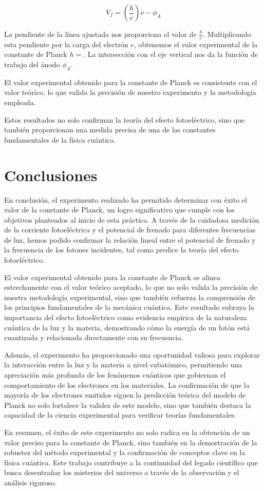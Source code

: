 \documentclass[twocolumn,a4paper,11pt]{scrartcl}
\begin{document}
\begin{equation}
V_f = \left(\frac{h}{e}\right) \nu - \phi_A
\end{equation}

La pendiente de la línea ajustada nos proporciona el valor de $\frac{h}{e}$. Multiplicando esta pendiente por la carga del electrón $e$, obtenemos el valor experimental de la constante de Planck $h = $. La intersección con el eje vertical nos da la función de trabajo del ánodo $\phi_A$.

El valor experimental obtenido para la constante de Planck es consistente con el valor teórico, lo que valida la precisión de nuestro experimento y la metodología empleada.

Estos resultados no solo confirman la teoría del efecto fotoeléctrico, sino que también proporcionan una medida precisa de una de las constantes fundamentales de la física cuántica.


\section{Conclusiones}

En conclusión, el experimento realizado ha permitido determinar con éxito el valor de la constante de Planck, un logro significativo que cumple con los objetivos planteados al inicio de esta práctica. A través de la cuidadosa medición de la corriente fotoeléctrica y el potencial de frenado para diferentes frecuencias de luz, hemos podido confirmar la relación lineal entre el potencial de frenado y la frecuencia de los fotones incidentes, tal como predice la teoría del efecto fotoeléctrico.

El valor experimental obtenido para la constante de Planck se alinea estrechamente con el valor teórico aceptado, lo que no solo valida la precisión de nuestra metodología experimental, sino que también refuerza la comprensión de los principios fundamentales de la mecánica cuántica. Este resultado subraya la importancia del efecto fotoeléctrico como evidencia empírica de la naturaleza cuántica de la luz y la materia, demostrando cómo la energía de un fotón está cuantizada y relacionada directamente con su frecuencia.

Además, el experimento ha proporcionado una oportunidad valiosa para explorar la interacción entre la luz y la materia a nivel subatómico, permitiendo una apreciación más profunda de los fenómenos cuánticos que gobiernan el comportamiento de los electrones en los materiales. La confirmación de que la mayoría de los electrones emitidos siguen la predicción teórica del modelo de Planck no solo fortalece la validez de este modelo, sino que también destaca la capacidad de la ciencia experimental para verificar teorías fundamentales.

En resumen, el éxito de este experimento no solo radica en la obtención de un valor preciso para la constante de Planck, sino también en la demostración de la robustez del método experimental y la confirmación de conceptos clave en la física cuántica. Este trabajo contribuye a la continuidad del legado científico que busca desentrañar los misterios del universo a través de la observación y el análisis riguroso.



\end{document}
